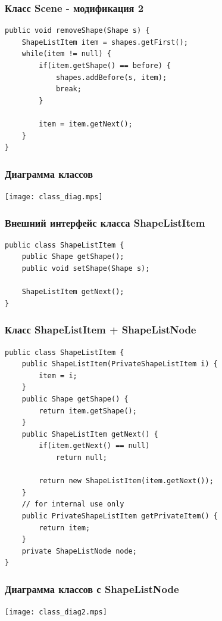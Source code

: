 \documentclass[handout]{beamer}
\begin{document}
\begin{frame}[fragile]
\frametitle{Класс Scene - модификация 2}
\begin{lstlisting}
public void removeShape(Shape s) {
    ShapeListItem item = shapes.getFirst();
    while(item != null) {
        if(item.getShape() == before) {
            shapes.addBefore(s, item);
            break;
        }

        item = item.getNext();
    }
}
\end{lstlisting}
\end{frame}


\begin{frame}[fragile]
\frametitle{Диаграмма классов}
\begin{center}
\texttt{[image: class\_diag.mps]}
\end{center}
\end{frame}


\begin{frame}[fragile]
\frametitle{Внешний интерфейс класса ShapeListItem}
\begin{lstlisting}
public class ShapeListItem {
    public Shape getShape();
    public void setShape(Shape s);

    ShapeListItem getNext();
}
\end{lstlisting}
\end{frame}


\begin{frame}[fragile]
\frametitle{Класс ShapeListItem + ShapeListNode}
\begin{lstlisting}
public class ShapeListItem {
    public ShapeListItem(PrivateShapeListItem i) {
        item = i;
    }
    public Shape getShape() {
        return item.getShape();
    }
    public ShapeListItem getNext() {
        if(item.getNext() == null)
            return null;

        return new ShapeListItem(item.getNext());
    }
    // for internal use only
    public PrivateShapeListItem getPrivateItem() {
        return item;
    }
    private ShapeListNode node;
}
\end{lstlisting}
\end{frame}


\begin{frame}[fragile]
\frametitle{Диаграмма классов с ShapeListNode}
\begin{center}
\texttt{[image: class\_diag2.mps]}
\end{center}
\end{frame}
\end{document}
